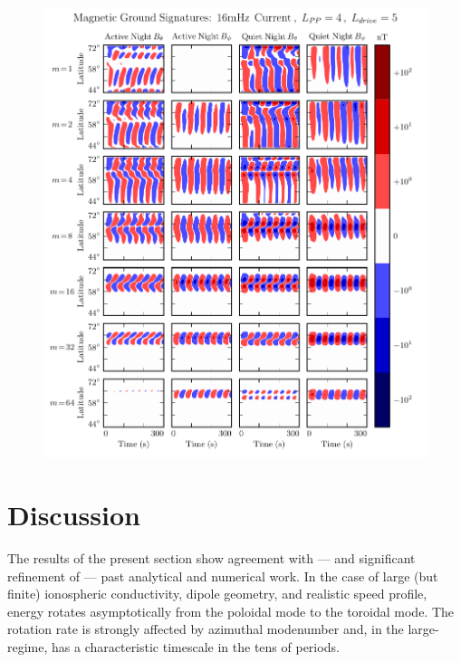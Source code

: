\begin{figure}[!htb]
    \centering
    \includegraphics[width=\textwidth]{figures/ground_16mHz_night_4_5.pdf}
    \caption[Nightside Ground Magnetic Fields]{
      \todo{$\cdots$}
    }
    \label{fig_ground_16mHz_night_4_5}
\end{figure}


\section{Discussion}

The results of the present section show agreement with --- and significant refinement of --- past analytical and numerical work. In the case of large (but finite) ionospheric conductivity, dipole geometry, and realistic \Alfven speed profile, energy rotates asymptotically from the poloidal mode to the toroidal mode. The rotation rate is strongly affected by azimuthal modenumber and, in the large-\azm regime, has a characteristic timescale in the tens of periods. 

